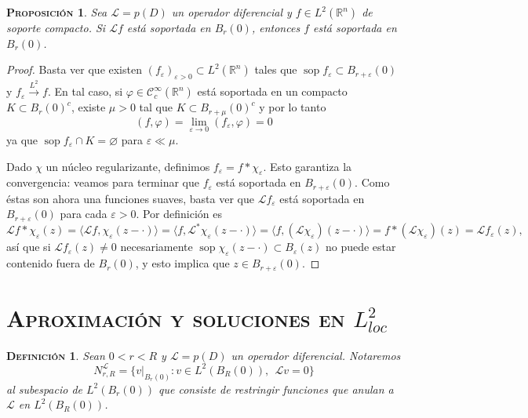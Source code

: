 \documentclass[11pt]{article}
\theoremstyle{colored}
\DeclareMathOperator{\sop}{sop}
\newtheorem{definition}{\scshape Definición}
\newtheorem{proposition}{\scshape Proposición}
\newcommand{\R}{\mathbb{R}}
\newcommand{\C}{\mathscr{C}}
\newcommand{\eps}{\varepsilon}
\newcommand{\ev}[1]{\langle #1 \rangle}
\renewcommand{\L}{\mathscr{L}}
\begin{document}
\begin{proposition}Sea $\L = p(D)$ un operador diferencial y $f \in L^2(\R^n)$ de soporte compacto. Si $\L f$ está soportada en $B_r(0)$, entonces $f$ está soportada en $B_r(0)$.
\end{proposition}
\begin{proof} Basta ver que existen $(f_\eps)_{\eps > 0} \subset L^2(\R^n)$ tales que $\sop f_\eps \subset B_{r+\eps}(0)$ y $f_\eps \xrightarrow{L^2} f$. En tal caso, si $\varphi \in \C_c^\infty(\R^n)$ está soportada en un compacto $K \subset B_r(0)^c$, existe $\mu > 0$ tal que $K \subset B_{r+\mu}(0)^c$ y por lo tanto
\[
(f,\varphi) = \lim_{\eps \to 0}(f_\eps,\varphi) = 0
\]
ya que $\sop f_\eps \cap K = \varnothing$ para $\eps \ll \mu$.

Dado $\chi$ un núcleo regularizante, definimos $f_\eps = f \ast \chi_\eps$. Esto garantiza la convergencia: veamos para terminar que $f_\eps$ está soportada en $B_{r+\eps}(0)$. Como éstas son ahora una funciones suaves, basta ver que $\L f_\eps$ está soportada en $B_{r+\eps}(0)$ para cada $\eps >0$. Por definición es
\[
\L f \ast \chi_\eps(z) = \ev{\L f,\chi_\eps(z-\cdot)} = \ev{f,\L^\ast\chi_\eps(z-\cdot)} = \ev{f,(\L\chi_\eps)(z-\cdot)} = f \ast (\L \chi_\eps
)(z) = \L f_\eps(z),
\]
así que si $\L f_\eps(z) \neq 0$ necesariamente $\sop \chi_\eps(z - \cdot) \subset B_\eps(z)$ no puede estar contenido fuera de $B_r(0)$, y esto implica que $z \in B_{r+\eps}(0)$.

\end{proof}

\section{\scshape Aproximación y soluciones en $L^2_{loc}$}

\begin{definition} Sean $0 < r < R$ y $\L = p(D)$ un operador diferencial. Notaremos
\[
N_{r,R}^\L = \{v|_{B_r(0)} : v \in L^2(B_R(0)), \ \ \L v = 0\}
\]
al subespacio de $L^2(B_r(0))$ que consiste de restringir funciones que anulan a $\L$ en $L^2(B_R(0))$.
\end{definition}
\end{document}
